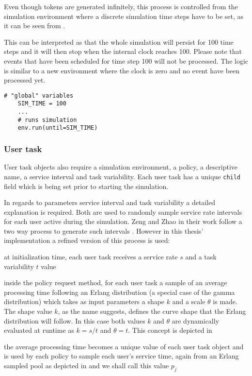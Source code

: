\documentclass{seal_thesis}
\begin{document}
Even though tokens are generated infinitely, this process is controlled from the simulation environment where a discrete simulation time steps have to be set, as it can be seen from .

This can be interpreted as that the whole simulation will persist for 100 time steps and it will then stop when the internal clock reaches 100. Please note that events that have been scheduled for time step 100 will not be processed. The logic is similar to a new environment where the clock is zero and no event have been processed yet.

\begin{lstlisting}[caption=Starting the simulation with discrete time steps,label=lst:simulation_steps,style=CustomPython]
    # "global" variables
    SIM_TIME = 100
    ...
    # runs simulation
    env.run(until=SIM_TIME)
\end{lstlisting}

\subsubsection{User task}
\label{subsec:user_task}

User task objects also require a simulation environment, a policy, a descriptive name, a service interval and task variability. Each user task has a unique \texttt{child} field which is being set prior to starting the simulation.

In regards to parameters service interval and task variability a detailed explanation is required. Both are used to randomly sample service rate intervals for each user active during the simulation. Zeng and Zhao in their work follow a two way process to generate such intervals \cite[p. 8]{Zeng2005}. However in this thesis' implementation a refined version of this process is used:
\begin{enumerate*}
	\item at initialization time, each user task receives a service rate $s$ and a task variability $t$ value
	\item inside the policy request method, for each user task a sample of an average processing time following an Erlang distribution (a special case of the gamma distribution) which takes as input parameters a shape $k$ and a scale $\theta$ is made. The shape value $k$, as the name suggests, defines the curve shape that the Erlang distribution will follow. In this case both values $k$ and $\theta$ are dynamically evaluated at runtime as $k=s/t$ and $\theta = t$. This concept is depicted in 
	\item the average processing time becomes a unique value of each user task object and is used by each policy to sample each user's service time, again from an Erlang sampled pool as depicted in  and we shall call this value $p_j$
\end{enumerate*}
\end{document}
